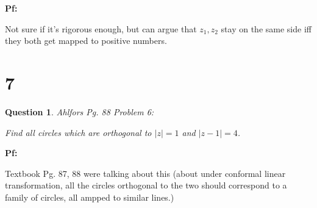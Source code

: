 \documentclass{article}
\newtheorem{question}{Question}
\begin{document}
\textbf{Pf:}

Not sure if it's rigorous enough, but can argue that $z_1,z_2$ stay on the same side iff they both get mapped to positive numbers.

\break

\section*{7}
\begin{myBox}[]{}
    \begin{question}
       Ahlfors Pg. 88 Problem 6:

       Find all circles which are orthogonal to $|z|=1$ and $|z-1|=4$.
    \end{question}
\end{myBox}

\textbf{Pf:}

Textbook Pg. 87, 88 were talking about this (about under conformal linear transformation, all the circles orthogonal to the two should correspond to a family of circles,
all ampped to similar lines.)
\end{document}
